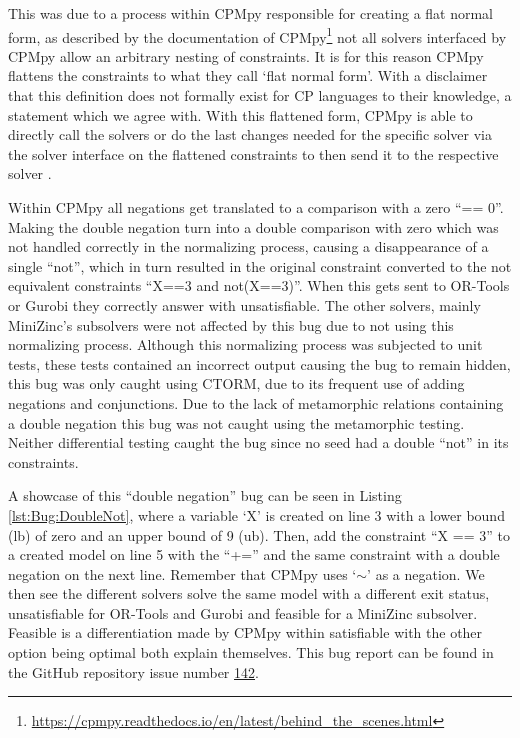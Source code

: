 This was due to a process within CPMpy responsible for creating a flat normal form, as described by the documentation of CPMpy\footnote{\url{https://cpmpy.readthedocs.io/en/latest/behind_the_scenes.html}} not all solvers interfaced by CPMpy allow an arbitrary nesting of constraints. It is for this reason CPMpy flattens the constraints to what they call ‘flat normal form’. With a disclaimer that this definition does not formally exist for CP languages to their knowledge, a statement which we agree with. With this flattened form, CPMpy is able to directly call the solvers or do the last changes needed for the specific solver via the solver interface on the flattened constraints to then send it to the respective solver \cite{CPMpyGithub}. 

Within CPMpy all negations get translated to a comparison with a zero “== 0”. Making the double negation turn into a double comparison with zero which was not handled correctly in the normalizing process, causing a disappearance of a single “not”, which in turn resulted in the original constraint converted to the not equivalent constraints “X==3 and not(X==3)”. When this gets sent to OR-Tools or Gurobi they correctly answer with unsatisfiable. The other solvers, mainly MiniZinc’s subsolvers were not affected by this bug due to not using this normalizing process. Although this normalizing process was subjected to unit tests, these tests contained an incorrect output causing the bug to remain hidden, this bug was only caught using CTORM, due to its frequent use of adding negations and conjunctions. Due to the lack of metamorphic relations containing a double negation this bug was not caught using the metamorphic testing. Neither differential testing caught the bug since no seed had a double “not” in its constraints. 

A showcase of this “double negation” bug can be seen in Listing \ref{lst:Bug:DoubleNot}, where a variable ‘X’ is created on line 3 with a lower bound (lb) of zero and an upper bound of 9 (ub). Then, add the constraint “X == 3” to a created model on line 5 with the “+=” and the same constraint with a double negation on the next line. Remember that CPMpy uses ‘$\sim$’ as a negation. We then see the different solvers solve the same model with a different exit status, unsatisfiable for OR-Tools and Gurobi and feasible for a MiniZinc subsolver. Feasible is a differentiation made by CPMpy within satisfiable with the other option being optimal both explain themselves. This bug report can be found in the GitHub repository issue number \href{https://github.com/CPMpy/cpmpy/issues/142}{142}.


